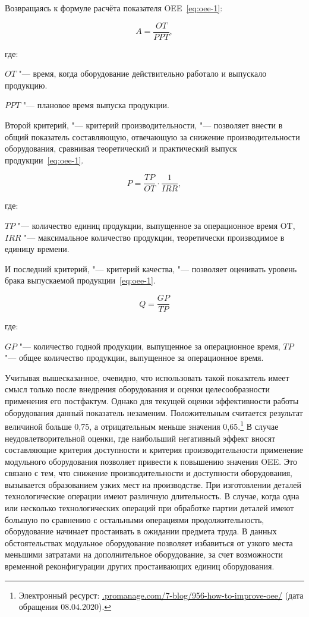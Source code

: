 Возвращаясь к формуле расчёта показателя OEE~\cref{eq:oee-1}:

\begin{equation}
	A = \frac{OT}{PPT},
	\label{eq:oee-1}
\end{equation}

\noindent где:

\noindent $OT$ "---  время, когда оборудование действительно работало и выпускало продукцию.

\noindent $PPT$ "--- плановое время выпуска продукции.

Второй критерий, "--- критерий производительности, "--- позволяет внести в общий показатель составляющую, отвечающую за снижение производительности оборудования, сравнивая теоретический и практический выпуск продукции~\cref{eq:oee-1}.

\begin{equation}
	P = \frac{TP}{OT} \cdot \frac{1}{IRR},
	\label{eq:oee-2}
\end{equation}

\noindent где:
 
\noindent $TP$ "--- количество единиц продукции, выпущенное за операционное время OT,
\noindent $IRR$ "--- максимальное количество продукции, теоретически производимое в единицу времени.

И последний критерий, "--- критерий качества, "--- позволяет оценивать уровень брака выпускаемой продукции~\cref{eq:oee-1}.

\begin{equation}
	Q = \frac{GP}{TP}
	\label{eq:oee-3}
\end{equation}

\noindent где:

\noindent $GP$ "--- количество годной продукции, выпущенное за операционное время,
\noindent $TP$ "--- общее количество продукции, выпущенное за операционное время.

Учитывая вышесказанное, очевидно, что использовать такой показатель имеет смысл только после внедрения оборудования и оценки целесообразности применения его постфактум. Однако для текущей оценки эффективности работы оборудования данный показатель незаменим. Положительным считается результат величиной больше 0,75, а отрицательным меньше значения 0,65.\footnote{Электронный ресурст: \url{.promanage.com/7-blog/956-how-to-improve-oee/} (дата обращения 08.04.2020).} В случае неудовлетворительной оценки, где наибольший негативный эффект вносят составляющие критерия доступности и критерия производительности применение модульного оборудования позволяет привести к повышению значения OEE. Это связано с тем, что снижение производительности и доступности оборудования, вызывается образованием узких мест на производстве. При изготовлении деталей технологические операции имеют различную длительность. В случае, когда одна или несколько технологических операций при обработке партии деталей имеют большую по сравнению с остальными операциями продолжительность, оборудование начинает простаивать в ожидании предмета труда. В данных обстоятельствах модульное оборудование позволяет избавиться от узкого места меньшими затратами на дополнительное оборудование, за счет возможности временной реконфигурации других простаивающих единиц оборудования. 

